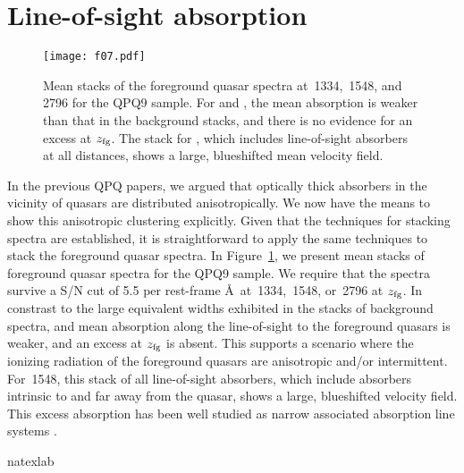 \documentclass[iop]{emulateapj}
\begin{document}
{\appendix

\section{Line-of-sight absorption}
\label{sec:appendix}

\begin{figure}
\texttt{[image: f07.pdf]}
\caption{Mean stacks of the foreground quasar spectra at \,1334, \,1548, and
\,2796 for the QPQ9 sample. For  and , the mean absorption is
weaker than that in the background stacks, and there is no evidence for an excess at $z_{\rm fg}$.
The stack for , which includes line-of-sight absorbers at all distances, shows a large,
blueshifted mean velocity field.
}
\label{fig:stacks_fg}
\end{figure}

In the previous QPQ papers, we argued that optically thick absorbers in the vicinity of quasars
are distributed anisotropically. We now have the means to show this anisotropic clustering
explicitly. Given that the techniques for stacking spectra are established, it is straightforward
to apply the same techniques to stack the foreground quasar spectra. In
Figure~\ref{fig:stacks_fg}, we present mean stacks of foreground quasar spectra for
the QPQ9 sample. We require that the spectra survive a S/N cut of 5.5 per rest-frame \AA\ at
\,1334, \,1548, or \,2796 at $z_{\rm fg}$. In constrast to the
large equivalent widths exhibited in the stacks of background spectra,  and 
mean absorption along the line-of-sight to the foreground quasars is weaker, and an excess at
$z_{\rm fg}$ is absent. This supports a scenario where the ionizing radiation of the foreground
quasars are anisotropic and/or intermittent. For \,1548, this stack of all line-of-sight
absorbers, which include absorbers intrinsic to and far away from the quasar, shows a large,
blueshifted velocity field. This excess  absorption has been well studied as narrow
associated absorption line systems \citep[e.g., ][]{Wild+08}.

%
%

\begin{thebibliography}{52}
\expandafter\ifx\csname natexlab\endcsname\relax\def\natexlab#1{#1}\fi


\end{thebibliography}}
\end{document}
